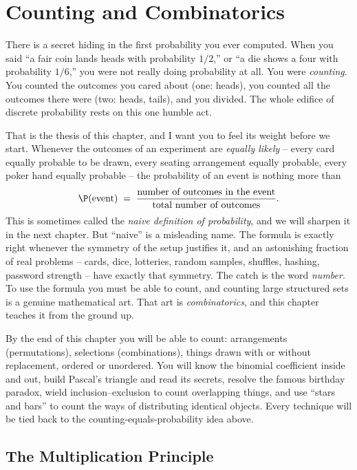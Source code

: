 \chapter{Counting and Combinatorics}

There is a secret hiding in the first probability you ever computed. When you said
``a fair coin lands heads with probability $1/2$,'' or ``a die shows a four with
probability $1/6$,'' you were not really doing probability at all. You were
\emph{counting}. You counted the outcomes you cared about (one: heads), you counted
all the outcomes there were (two: heads, tails), and you divided. The whole edifice
of discrete probability rests on this one humble act.

That is the thesis of this chapter, and I want you to feel its weight before we start.
Whenever the outcomes of an experiment are \emph{equally likely} -- every card equally
probable to be drawn, every seating arrangement equally probable, every poker hand
equally probable -- the probability of an event is nothing more than
\[
  \P(\text{event}) \;=\; \frac{\text{number of outcomes in the event}}{\text{total number of outcomes}}.
\]
This is sometimes called the \emph{naive definition of probability}, and we will sharpen
it in the next chapter. But ``naive'' is a misleading name. The formula is exactly right
whenever the symmetry of the setup justifies it, and an astonishing fraction of real
problems -- cards, dice, lotteries, random samples, shuffles, hashing, password
strength -- have exactly that symmetry. The catch is the word \emph{number}. To use the
formula you must be able to count, and counting large structured sets is a genuine
mathematical art. That art is \emph{combinatorics}, and this chapter teaches it from the
ground up.

\begin{focusbox}
By the end of this chapter you will be able to count: arrangements (permutations),
selections (combinations), things drawn with or without replacement, ordered or
unordered. You will know the binomial coefficient inside and out, build Pascal's
triangle and read its secrets, resolve the famous birthday paradox, wield
inclusion--exclusion to count overlapping things, and use ``stars and bars'' to count
the ways of distributing identical objects. Every technique will be tied back to the
counting-equals-probability idea above.
\end{focusbox}

\section{The Multiplication Principle}
\label{ch2:multiplication}

